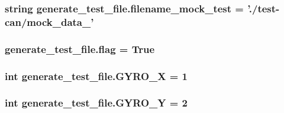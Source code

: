 \hypertarget{namespacegenerate__test__file_a93a79e69087952ef413ac002eb1391e4}{
\subsubsection[{filename\-\_\-mock\-\_\-test}]{\setlength{\rightskip}{0pt plus 5cm}string generate\-\_\-test\-\_\-file.\-filename\-\_\-mock\-\_\-test = './test-\/can/mock\-\_\-data\-\_\-'}}\label{namespacegenerate__test__file_a93a79e69087952ef413ac002eb1391e4}
\hypertarget{namespacegenerate__test__file_ab1543fba4ccafa097bd330adcc0c26ce}{
\subsubsection[{flag}]{\setlength{\rightskip}{0pt plus 5cm}generate\-\_\-test\-\_\-file.\-flag = True}}\label{namespacegenerate__test__file_ab1543fba4ccafa097bd330adcc0c26ce}
\hypertarget{namespacegenerate__test__file_acc0d977a4653e6323d3544f555bd7864}{
\subsubsection[{G\-Y\-R\-O\-\_\-\-X}]{\setlength{\rightskip}{0pt plus 5cm}int generate\-\_\-test\-\_\-file.\-G\-Y\-R\-O\-\_\-\-X = 1}}\label{namespacegenerate__test__file_acc0d977a4653e6323d3544f555bd7864}
\hypertarget{namespacegenerate__test__file_a79b2d88416dae5a3c9ad3b99c54d2b06}{
\subsubsection[{G\-Y\-R\-O\-\_\-\-Y}]{\setlength{\rightskip}{0pt plus 5cm}int generate\-\_\-test\-\_\-file.\-G\-Y\-R\-O\-\_\-\-Y = 2}}\label{namespacegenerate__test__file_a79b2d88416dae5a3c9ad3b99c54d2b06}

